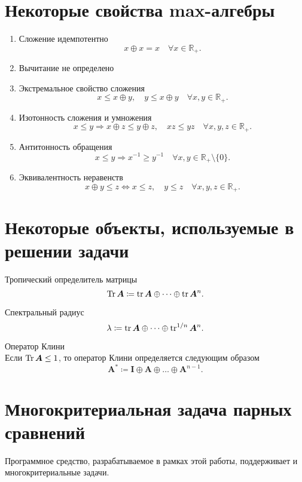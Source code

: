 \documentclass[specialist,
	substylefile = spbu_report.rtx,
	subf,href,colorlinks=true, 12pt]{disser}
\begin{document}
\section{Некоторые свойства max-алгебры}
\begin{enumerate}
	\item Сложение идемпотентно
	      \[
		      x \oplus x = x \quad \forall x \in \mathbb{R}_+.
	      \]
	\item Вычитание не определено
	\item Экстремальное свойство сложения
	      \[
		      x \leq x \oplus y,\quad y \leq x \oplus y \quad \forall x, y \in \mathbb{R}_+.
	      \]
	\item Изотонность сложения и умножения
	      \[
		      x \leq y \Rightarrow x \oplus z \leq y \oplus z,\quad xz \leq yz \quad \forall x,y,z \in \mathbb{R}_+.
	      \]
	\item Антитонность обращения
	      \[
		      x \leq y \Rightarrow x^{-1} \geq y^{-1} \quad\forall x,y \in \mathbb{R}_+ \setminus \{0\}.
	      \]
	\item Эквивалентность неравенств
	      \[
		      x \oplus y \leq z \Leftrightarrow x \leq z,\quad y \leq z \quad \forall x,y,z \in \mathbb{R}_+.
	      \]
\end{enumerate}
\section{Некоторые объекты, используемые в решении задачи}

\begin{definition}{Тропический определитель матрицы}
	\[
		\operatorname{Tr} \boldsymbol{A} \coloneqq \operatorname{tr}\boldsymbol{A} \oplus \dots \oplus \operatorname{tr}\boldsymbol{A}^n.
	\]
\end{definition}
\begin{definition}{Спектральный радиус}
	\[
		\lambda \coloneqq \operatorname{tr}\boldsymbol{A} \oplus \dots \oplus \operatorname{tr}^{1/n}\boldsymbol{A}^n.
	\]
\end{definition}
\begin{definition}{Оператор Клини\\}
	Если $\operatorname{Tr} \boldsymbol{A} \leq 1$, то оператор Клини определяется следующим образом
	\[
		\boldsymbol{A}^* \coloneqq \boldsymbol{I} \oplus \boldsymbol{A} \oplus \dots \oplus \boldsymbol{A}^{n-1}.
	\]
\end{definition}

\section{Многокритериальная задача парных сравнений}
Программное средство, разрабатываемое в рамках этой работы, поддерживает и многокритериальные задачи.
\end{document}
